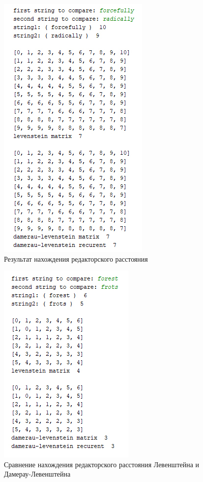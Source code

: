 \documentclass[a4paper,12pt]{report}
\begin{document}
\begin{center}
    	\newpage
    	\begin{figure}[h!]
    		\includegraphics[width=0.6\linewidth]{test2.jpg}
    		\caption{Результат нахождения редакторского расстояния}
    		\label{ris:test5}
    	\end{figure}
    
    	\newpage
    	\begin{figure}[h!]
    		\includegraphics[width=0.6\linewidth]{test1.jpg}
    		\caption{Сравнение нахождения редакторского расстояния Левенштейна и Дамерау-Левенштейна}
    		\label{ris:test6}
    	\end{figure}


\end{center}
\end{document}
